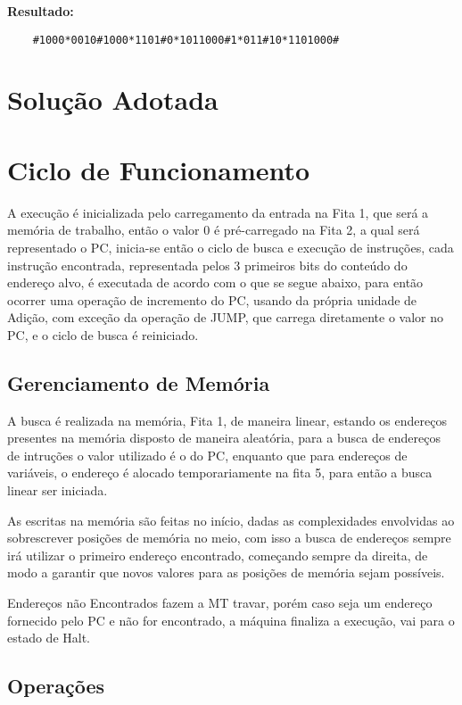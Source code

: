 \documentclass[a4paper,12pt]{article}
\begin{document}
\textbf{Resultado:}
\begin{verbatim}
    #1000*0010#1000*1101#0*1011000#1*011#10*1101000#
\end{verbatim}


\newpage
\section{Solução Adotada}

\section*{Ciclo de Funcionamento}
A execução é inicializada pelo carregamento da entrada na Fita 1, que será a memória de trabalho, então o valor $0$ é pré-carregado na Fita 2, a qual será representado o PC, inicia-se então o ciclo de busca e execução de instruções, cada instrução encontrada, representada pelos 3 primeiros bits do conteúdo do endereço alvo, é executada de acordo com o que se segue abaixo, para então ocorrer uma operação de incremento do PC, usando da própria unidade de Adição, com exceção da operação de JUMP, que carrega diretamente o valor no PC, e o ciclo de busca é reiniciado.

\subsection*{Gerenciamento de Memória}
A busca é realizada na memória, Fita 1, de maneira linear, estando os endereços presentes na memória disposto de maneira aleatória, para a busca de endereços de intruções o valor utilizado é o do PC, enquanto que para endereços de variáveis, o endereço é alocado temporariamente na fita 5, para então a busca linear ser iniciada.

As escritas na memória são feitas no início, dadas as complexidades envolvidas ao sobrescrever posições de memória no meio, com isso a busca de endereços sempre irá utilizar o primeiro endereço encontrado, começando sempre da direita, de modo a garantir que novos valores para as posições de memória sejam possíveis.

Endereços não Encontrados fazem a MT travar, porém caso seja um endereço fornecido pelo PC e não for encontrado, a máquina finaliza a execução, vai para o estado de Halt.

\newpage
\subsection{Operações}
\end{document}
